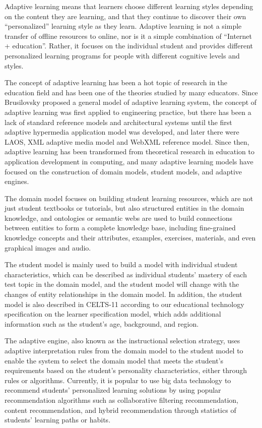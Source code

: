 Adaptive learning means that learners choose different learning styles depending on the content they are learning, and that they continue to discover their own ``personalized'' learning style as they learn. Adaptive learning is not a simple transfer of offline resources to online, nor is it a simple combination of ``Internet + education''. Rather, it focuses on the individual student and provides different personalized learning programs for people with different cognitive levels and styles.

The concept of adaptive learning has been a hot topic of research in the education field and has been one of the theories studied by many educators. Since Brusilovsky proposed a general model of adaptive learning system\cite{brusilovsky2001adaptive}, the concept of adaptive learning was first applied to engineering practice, but there has been a lack of standard reference models and architectural systems until the first adaptive hypermedia application model was developed, and later there were LAOS, XML adaptive media model and WebXML reference model.
Since then, adaptive learning has been transformed from theoretical research in education to application development in computing, and many adaptive learning models have focused on the construction of domain models, student models, and adaptive engines.

The domain model focuses on building student learning resources, which are not just student textbooks or tutorials, but also structured entities in the domain knowledge, and ontologies or semantic webs are used to build connections between entities to form a complete knowledge base, including fine-grained knowledge concepts and their attributes, examples, exercises, materials, and even graphical images and audio.

The student model is mainly used to build a model with individual student characteristics, which can be described as individual students' mastery of each test topic in the domain model, and the student model will change with the changes of entity relationships in the domain model. In addition, the student model is also described in CELTS-11 according to our educational technology specification on the learner specification model, which adds additional information such as the student's age, background, and region.

The adaptive engine, also known as the instructional selection strategy, uses adaptive interpretation rules from the domain model to the student model to enable the system to select the domain model that meets the student's requirements based on the student's personality characteristics, either through rules or algorithms. Currently, it is popular to use big data technology to recommend students' personalized learning solutions by using popular recommendation algorithms such as collaborative filtering recommendation, content recommendation, and hybrid recommendation through statistics of students' learning paths or habits.

